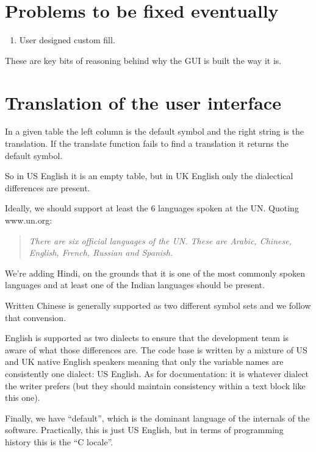 \section{Problems to be fixed eventually}

\begin{enumerate}
\item User designed custom fill.
\end{enumerate}

These are key bits of reasoning behind why the GUI is built the way it is.

\section{Translation of the user interface}

In a given table the left column is the default symbol and the right string is the translation. If the translate function fails to find a translation it returns the default symbol.

So in US English it is an empty table, but in UK English
only the dialectical differences are present.

Ideally, we should support at least the 6 languages spoken at the UN. Quoting www.un.org:

\begin{quote}
\emph{There are six official languages of the UN. These are Arabic, Chinese, English, French, Russian and Spanish.}
\end{quote}

We're adding Hindi, on the grounds that it is one of the most commonly spoken languages and at least one of the Indian languages should be present.

Written Chinese is generally supported as two different symbol sets and we follow that convension.

English is supported as two dialects to ensure that the development team is aware of what those differences are. The code base is written by a mixture of US and UK native English speakers meaning that only the variable names are consistently one dialect: US English. As for documentation: it is whatever dialect the writer prefers (but they should maintain consistency within a text block like this one).

Finally, we have ``default'', which is the dominant language
of the internals of the software. Practically, this is
just US English, but in terms of programming history this
is the ``C locale''. 

